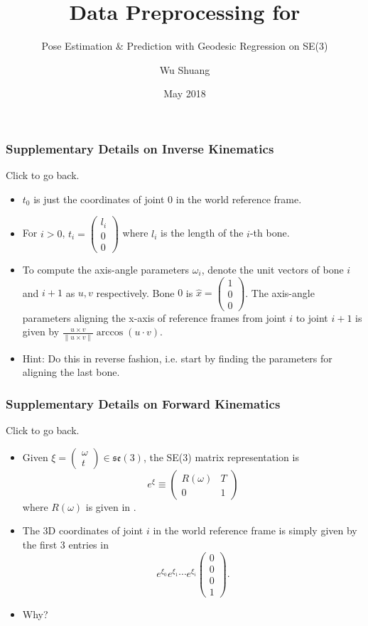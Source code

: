 \documentclass{beamer}
\title[Data Preprocessing]{Data Preprocessing for}
\subtitle{Pose Estimation \& Prediction with Geodesic Regression on SE(3)}
\author{Wu Shuang}
\date{May 2018}
\begin{document}
\begin{frame} [label=inverse]
\frametitle{Supplementary Details on Inverse Kinematics}
Click \hyperref{DataPreprocessing.pdf}{page}{11}{} to go back.
\begin{itemize}
\justifying
\item $t_0$ is just the coordinates of joint 0 in the world reference frame.
\item For $i>0$, $t_i=\left(\begin{matrix} l_i \\ 0 \\ 0 \end{matrix}\right)$ where $l_i$ is the length of the $i$-th bone.
\item To compute the axis-angle parameters $\omega_i$, denote the unit vectors of bone $i$ and $i+1$ as $u,v$ respectively. Bone $0$ is $\hat{x}=\left(\begin{matrix} 1 \\ 0 \\ 0 \end{matrix}\right)$. The axis-angle parameters aligning the x-axis of reference frames from joint $i$ to joint $i+1$ is given by $\frac{u\times v}{\lVert u\times v \rVert} \arccos(u\cdot v)$.
\item Hint: Do this in reverse fashion, i.e. start by finding the parameters for aligning the last bone.
\end{itemize}
\end{frame}

\begin{frame} [label=forward]
\frametitle{Supplementary Details on Forward Kinematics}
Click \hyperref{DataPreprocessing.pdf}{page}{13}{} to go back.
\begin{itemize}
\justifying
\item Given $\xi=\left(\begin{matrix} \omega \\ t \end{matrix}\right)\in\mathfrak{se}(3)$, the SE(3) matrix representation is $$e^{\xi}\equiv\left(\begin{matrix} R(\omega) & T \\ 0 & 1 \end{matrix}\right)$$ where $R(\omega)$ is given in \hyperref{DataPreprocessing.pdf}{page}{8}{}.
\item The 3D coordinates of joint $i$ in the world reference frame is simply given by the first 3 entries in
$$e^{\xi_0}e^{\xi_1} \cdots e^{\xi_i} \left(\begin{matrix} 0 \\ 0 \\ 0 \\1 \end{matrix}\right).$$
\item Why?
\end{itemize}
\end{frame}
\end{document}
